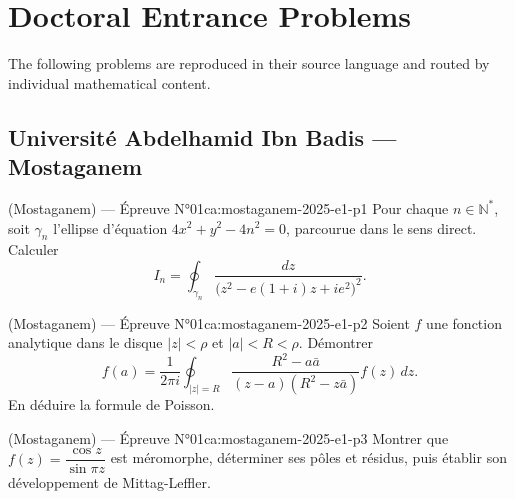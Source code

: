 \chapter{Doctoral Entrance Problems}
\label{ch:problems}

The following problems are reproduced in their source language and routed by individual mathematical content.
\newpage

\section{Université Abdelhamid Ibn Badis --- Mostaganem}
\begin{problem}{(Mostaganem) — Épreuve N°01}{ca:mostaganem-2025-e1-p1}
Pour chaque $n\in\mathbb{N}^{*}$, soit $\gamma_n$ l'ellipse d'équation $4x^{2}+y^{2}-4n^{2}=0$, parcourue dans le sens direct. Calculer
$$I_n=\oint_{\gamma_n}\frac{dz}{\bigl(z^{2}-e(1+i)z+ie^{2}\bigr)^{2}}.$$
\end{problem}
\newpage
\begin{problem}{(Mostaganem) — Épreuve N°01}{ca:mostaganem-2025-e1-p2}
Soient $f$ une fonction analytique dans le disque $|z|<\rho$ et $|a|<R<\rho$. Démontrer
$$f(a)=\frac{1}{2\pi i}\oint_{|z|=R}\frac{R^{2}-a\bar a}{(z-a)(R^{2}-z\bar a)}f(z)\,dz.$$
En déduire la formule de Poisson.
\end{problem}
\newpage
\begin{problem}{(Mostaganem) — Épreuve N°01}{ca:mostaganem-2025-e1-p3}
Montrer que $f(z)=\dfrac{\cos z}{\sin \pi z}$ est méromorphe, déterminer ses pôles et résidus, puis établir son développement de Mittag-Leffler.
\end{problem}
\newpage

